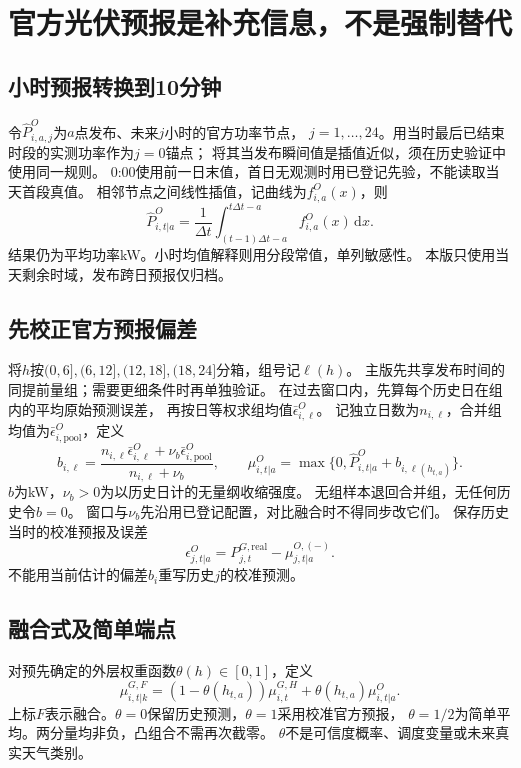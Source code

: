 \documentclass[UTF8,11pt]{ctexart}
\begin{document}
\section{官方光伏预报是补充信息，不是强制替代}
\subsection{小时预报转换到10分钟}
令$\widehat P^O_{i,a,j}$为$a$点发布、未来$j$小时的官方功率节点，
$j=1,\ldots,24$。用当时最后已结束时段的实测功率作为$j=0$锚点；
将其当发布瞬间值是插值近似，须在历史验证中使用同一规则。
0:00使用前一日末值，首日无观测时用已登记先验，不能读取当天首段真值。
相邻节点之间线性插值，记曲线为$f^O_{i,a}(x)$，则
\begin{equation}
 \widehat P^O_{i,t|a}
 =\frac1{\Delta t}\int_{(t-1)\Delta t-a}^{t\Delta t-a}
                      f^O_{i,a}(x)\,\mathrm dx .
\end{equation}
结果仍为平均功率kW。小时均值解释则用分段常值，单列敏感性。
本版只使用当天剩余时域，发布跨日预报仅归档。

\subsection{先校正官方预报偏差}
将$h$按$(0,6],(6,12],(12,18],(18,24]$分箱，组号记$\ell(h)$。
主版先共享发布时间的同提前量组；需要更细条件时再单独验证。
在过去窗口内，先算每个历史日在组内的平均原始预测误差，
再按日等权求组均值$\bar\epsilon_{i,\ell}^O$。
记独立日数为$n_{i,\ell}$，合并组均值为$\bar\epsilon_{i,\mathrm{pool}}^O$，定义
\begin{equation}
 b_{i,\ell}=
 \frac{n_{i,\ell}\bar\epsilon_{i,\ell}^O+
             \nu_b\bar\epsilon_{i,\mathrm{pool}}^O}{n_{i,\ell}+\nu_b},
 \qquad
 \mu^O_{i,t|a}=\max\{0,\widehat P^O_{i,t|a}+b_{i,\ell(h_{t,a})}\}.
\end{equation}
$b$为kW，$\nu_b>0$为以历史日计的无量纲收缩强度。
无组样本退回合并组，无任何历史令$b=0$。
窗口与$\nu_b$先沿用已登记配置，对比融合时不得同步改它们。
保存历史当时的校准预报及误差
\begin{equation}
 \epsilon^O_{j,t|a}=P^{G,\mathrm{real}}_{j,t}-\mu^{O,(-)}_{j,t|a}.
\end{equation}
不能用当前估计的偏差$b_i$重写历史$j$的校准预测。

\subsection{融合式及简单端点}\label{sec:fusion}
对预先确定的外层权重函数$\theta(h)\in[0,1]$，定义
\begin{equation}\label{eq:fusion}
 \mu^{G,F}_{i,t|k}
 =(1-\theta(h_{t,a}))\mu^{G,H}_{i,t}
          +\theta(h_{t,a})\mu^O_{i,t|a}.
\end{equation}
上标$F$表示融合。$\theta=0$保留历史预测，$\theta=1$采用校准官方预报，
$\theta=1/2$为简单平均。两分量均非负，凸组合不需再次截零。
$\theta$不是可信度概率、调度变量或未来真实天气类别。
\end{document}
